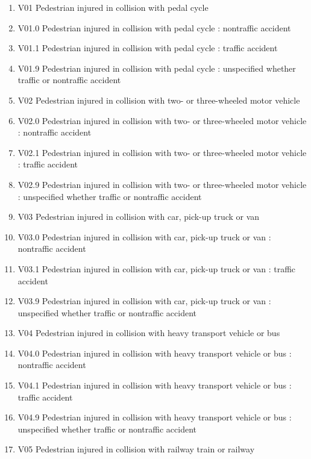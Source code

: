 \documentclass[
]{scrartcl}
\providecommand{\tightlist}{%
  \setlength{\itemsep}{0pt}\setlength{\parskip}{0pt}}\usepackage{longtable,booktabs,array}
\begin{document}
\begin{itemize}
  \begin{enumerate}
  \def\labelenumi{\arabic{enumi}.}
  \setcounter{enumi}{1109}
  \tightlist
  \item
    V01 Pedestrian injured in collision with pedal cycle
  \item
    V01.0 Pedestrian injured in collision with pedal cycle : nontraffic
    accident
  \item
    V01.1 Pedestrian injured in collision with pedal cycle : traffic
    accident
  \item
    V01.9 Pedestrian injured in collision with pedal cycle : unspecified
    whether traffic or nontraffic accident
  \item
    V02 Pedestrian injured in collision with two- or three-wheeled motor
    vehicle
  \item
    V02.0 Pedestrian injured in collision with two- or three-wheeled
    motor vehicle : nontraffic accident
  \item
    V02.1 Pedestrian injured in collision with two- or three-wheeled
    motor vehicle : traffic accident
  \item
    V02.9 Pedestrian injured in collision with two- or three-wheeled
    motor vehicle : unspecified whether traffic or nontraffic accident
  \item
    V03 Pedestrian injured in collision with car, pick-up truck or van
  \item
    V03.0 Pedestrian injured in collision with car, pick-up truck or van
    : nontraffic accident
  \item
    V03.1 Pedestrian injured in collision with car, pick-up truck or van
    : traffic accident
  \item
    V03.9 Pedestrian injured in collision with car, pick-up truck or van
    : unspecified whether traffic or nontraffic accident
  \item
    V04 Pedestrian injured in collision with heavy transport vehicle or
    bus
  \item
    V04.0 Pedestrian injured in collision with heavy transport vehicle
    or bus : nontraffic accident
  \item
    V04.1 Pedestrian injured in collision with heavy transport vehicle
    or bus : traffic accident
  \item
    V04.9 Pedestrian injured in collision with heavy transport vehicle
    or bus : unspecified whether traffic or nontraffic accident
  \item
    V05 Pedestrian injured in collision with railway train or railway

\end{enumerate}
\end{itemize}
\end{document}
